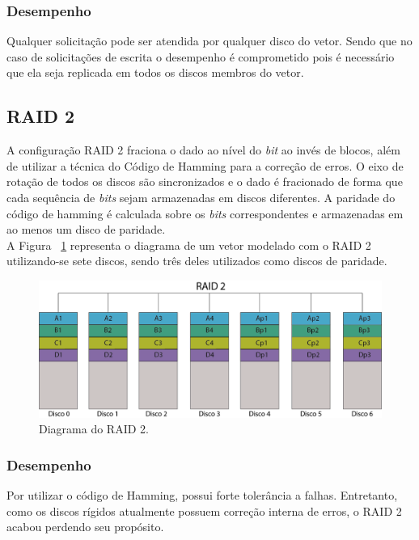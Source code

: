 \subsubsection{Desempenho}

Qualquer solicitação pode ser atendida por qualquer disco do vetor. Sendo que no caso de solicitações de escrita o desempenho é comprometido pois é necessário que ela seja replicada em todos os discos membros do vetor. \\

\subsection{RAID 2}

A configuração RAID 2 fraciona o dado ao nível do \textit{bit} ao invés de blocos, além de utilizar a técnica do Código de Hamming para a correção de erros. O eixo de rotação de todos os discos são sincronizados e o dado é fracionado de forma que cada sequência de \textit{bits} sejam armazenadas em discos diferentes. A paridade do código de hamming é calculada sobre os \textit{bits} correspondentes e armazenadas em ao menos um disco de paridade.\\

A Figura ~\ref{fig:raid2} representa o diagrama de um vetor modelado com o RAID 2 utilizando-se sete discos, sendo três deles utilizados como discos de paridade.\\

\begin{figure}[htb]
	\begin{center}
		
		\includegraphics[clip,scale=0.35]{images/RAID_2.png}
		\caption{Diagrama do RAID 2. }
		\label{fig:raid2}
	\end{center}
\end{figure} 

\subsubsection{Desempenho}
Por utilizar o código de Hamming, possui forte tolerância a falhas. Entretanto, como os discos rígidos atualmente possuem correção interna de erros, o RAID 2 acabou perdendo seu propósito. 

